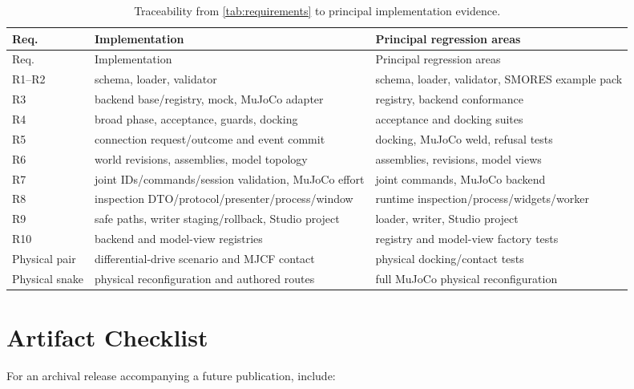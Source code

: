 \begin{longtable}{L{0.11\textwidth}L{0.35\textwidth}L{0.40\textwidth}}
\caption{Traceability from \cref{tab:requirements} to principal implementation evidence.}
\label{tab:traceability}\\
\toprule
Req. & Implementation & Principal regression areas \\
\midrule
\endfirsthead
\toprule
Req. & Implementation & Principal regression areas \\
\midrule
\endhead
R1--R2 & schema, loader, validator & schema, loader, validator, SMORES example pack \\
R3 & backend base/registry, mock, MuJoCo adapter & registry, backend conformance \\
R4 & broad phase, acceptance, guards, docking & acceptance and docking suites \\
R5 & connection request/outcome and event commit & docking, MuJoCo weld, refusal tests \\
R6 & world revisions, assemblies, model topology & assemblies, revisions, model views \\
R7 & joint IDs/commands/session validation, MuJoCo effort & joint commands, MuJoCo backend \\
R8 & inspection DTO/protocol/presenter/process/window & runtime inspection/process/widgets/worker \\
R9 & safe paths, writer staging/rollback, Studio project & loader, writer, Studio project \\
R10 & backend and model-view registries & registry and model-view factory tests \\
Physical pair & differential-drive scenario and MJCF contact & physical docking/contact tests \\
Physical snake & physical reconfiguration and authored routes & full MuJoCo physical reconfiguration \\
\bottomrule
\end{longtable}

\section{Artifact Checklist}
\label{app:artifact}

For an archival release accompanying a future publication, include:

